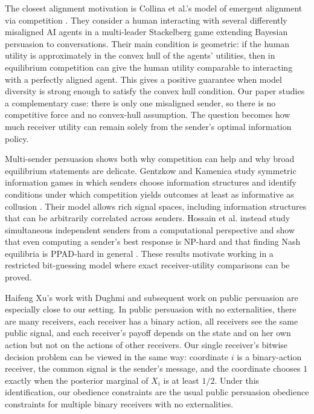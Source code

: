 \documentclass[format=acmsmall, review=false]{acmart}
\begin{document}
The closest alignment motivation is Collina et al.'s model of emergent
alignment via competition \cite{collina2025emergent}. They consider a human
interacting with several differently misaligned AI agents in a multi-leader
Stackelberg game extending Bayesian persuasion to conversations. Their main
condition is geometric: if the human utility is approximately in the convex hull
of the agents' utilities, then in equilibrium competition can give the human
utility comparable to interacting with a perfectly aligned agent. This gives a
positive guarantee when model diversity is strong enough to satisfy the convex
hull condition. Our paper studies a complementary case: there is only one
misaligned sender, so there is no competitive force and no convex-hull
assumption. The question becomes how much receiver utility can remain solely
from the sender's optimal information policy.

Multi-sender persuasion shows both why competition can help and why broad
equilibrium statements are delicate. Gentzkow and Kamenica study symmetric
information games in which senders choose information structures and identify
conditions under which competition yields outcomes at least as informative as
collusion \cite{gentzkow2017competition}. Their model allows rich signal spaces,
including information structures that can be arbitrarily correlated across
senders. Hossain et al. instead study simultaneous independent senders from a
computational perspective and show that even computing a sender's best response
is NP-hard and that finding Nash equilibria is PPAD-hard in general
\cite{hossain2024multisender}. These results motivate working in a restricted
bit-guessing model where exact receiver-utility comparisons can be proved.

Haifeng Xu's work with Dughmi and subsequent work on public persuasion are
especially close to our setting. In public persuasion with no externalities,
there are many receivers, each receiver has a binary action, all receivers see
the same public signal, and each receiver's payoff depends on the state and on
her own action but not on the actions of other receivers. Our single receiver's
bitwise decision problem can be viewed in the same way: coordinate $i$ is a
binary-action receiver, the common signal is the sender's message, and the
coordinate chooses $1$ exactly when the posterior marginal of $X_i$ is at least
$1/2$. Under this identification, our obedience constraints are the usual public
persuasion obedience constraints for multiple binary receivers with no
externalities.
\end{document}
